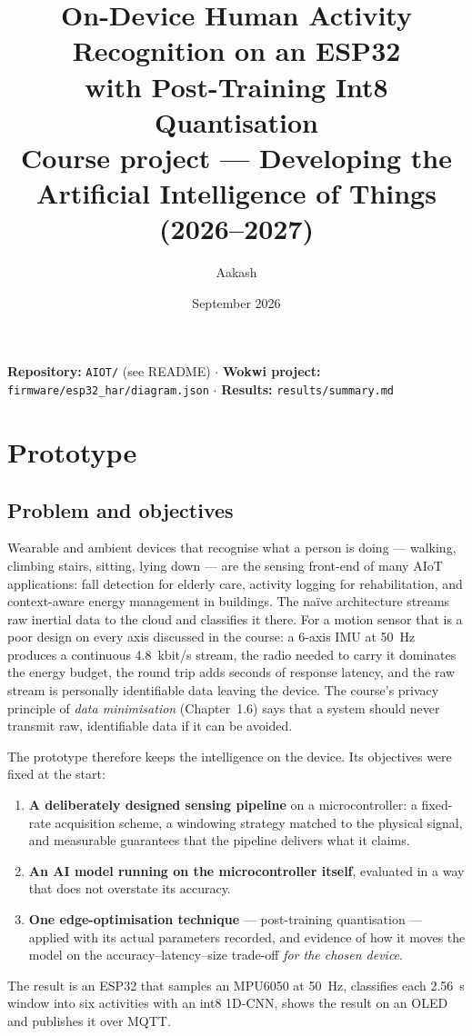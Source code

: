 \documentclass[10pt,a4paper]{article}
\title{\textbf{On-Device Human Activity Recognition on an ESP32\\ with Post-Training Int8 Quantisation}\\[4pt]
\large Course project --- Developing the Artificial Intelligence of Things (2026--2027)}
\author{Aakash}
\date{September 2026}
\begin{document}
\maketitle
\vspace{-14pt}
\begin{center}\small
\textbf{Repository:} \texttt{AIOT/} (see README) \quad$\cdot$\quad
\textbf{Wokwi project:} \texttt{firmware/esp32\_har/diagram.json} \quad$\cdot$\quad
\textbf{Results:} \texttt{results/summary.md}
\end{center}

\section{Prototype}

\subsection{Problem and objectives}

Wearable and ambient devices that recognise what a person is doing --- walking, climbing stairs, sitting, lying down --- are the sensing front-end of many AIoT applications: fall detection for elderly care, activity logging for rehabilitation, and context-aware energy management in buildings. The na\"ive architecture streams raw inertial data to the cloud and classifies it there. For a motion sensor that is a poor design on every axis discussed in the course: a 6-axis IMU at \SI{50}{\hertz} produces a continuous \SI{4.8}{kbit/s} stream, the radio needed to carry it dominates the energy budget, the round trip adds seconds of response latency, and the raw stream is personally identifiable data leaving the device. The course's privacy principle of \emph{data minimisation} (Chapter~1.6) says that a system should never transmit raw, identifiable data if it can be avoided.

The prototype therefore keeps the intelligence on the device. Its objectives were fixed at the start:
\begin{enumerate}
  \item \textbf{A deliberately designed sensing pipeline} on a microcontroller: a fixed-rate acquisition scheme, a windowing strategy matched to the physical signal, and measurable guarantees that the pipeline delivers what it claims.
  \item \textbf{An AI model running on the microcontroller itself}, evaluated in a way that does not overstate its accuracy.
  \item \textbf{One edge-optimisation technique} --- post-training quantisation --- applied with its actual parameters recorded, and evidence of how it moves the model on the accuracy--latency--size trade-off \emph{for the chosen device}.
\end{enumerate}
The result is an ESP32 that samples an MPU6050 at \SI{50}{\hertz}, classifies each \SI{2.56}{\second} window into six activities with an int8 1D-CNN, shows the result on an OLED and publishes it over MQTT.
\end{document}
